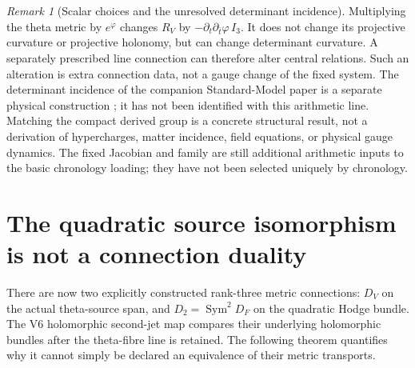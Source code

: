 \documentclass[11pt]{article}
\theoremstyle{definition}
\theoremstyle{remark}
\newtheorem{remark}[remark]{Remark}
\begin{document}
\begin{remark}[Scalar choices and the unresolved determinant incidence]
Multiplying the theta metric by $e^\varphi$ changes $R_V$ by
$-\partial_t\partial_{\bar t}\varphi\,I_3$. It does not change its
projective curvature or projective holonomy, but can change determinant
curvature. A separately prescribed line connection can therefore alter
central relations. Such an alteration is extra connection data, not a gauge
change of the fixed system. The determinant incidence of the companion
Standard-Model paper is a separate physical construction \cite{Duality};
it has not been identified with this arithmetic line. Matching the compact
derived group is a concrete structural result, not a derivation of
hypercharges, matter incidence, field equations, or physical gauge dynamics.
The fixed Jacobian and family are still additional arithmetic inputs to the
basic chronology loading; they have not been selected uniquely by chronology.
\end{remark}

\section{The quadratic source isomorphism is not a connection duality}
\label{sec:v9-curvature-obstruction}

There are now two explicitly constructed rank-three metric connections:
$D_V$ on the actual theta-source span, and
$D_2=\operatorname{Sym}^2D_F$ on the quadratic Hodge bundle. The V6
holomorphic second-jet map compares their underlying holomorphic bundles
after the theta-fibre line is retained. The following theorem quantifies
why it cannot simply be declared an equivalence of their metric transports.
\end{document}
